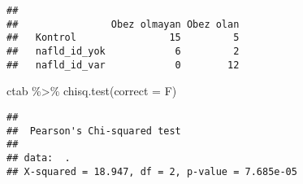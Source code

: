 \documentclass[
]{article}
\newenvironment{Shaded}{\begin{snugshade}}{\end{snugshade}}
\newcommand{\AttributeTok}[1]{\textcolor[rgb]{0.77,0.63,0.00}{#1}}
\newcommand{\FunctionTok}[1]{\textcolor[rgb]{0.00,0.00,0.00}{#1}}
\newcommand{\NormalTok}[1]{#1}
\newcommand{\SpecialCharTok}[1]{\textcolor[rgb]{0.00,0.00,0.00}{#1}}
\begin{document}
\begin{verbatim}
##               
##                Obez olmayan Obez olan
##   Kontrol                15         5
##   nafld_id_yok            6         2
##   nafld_id_var            0        12
\end{verbatim}

\begin{Shaded}
\begin{Highlighting}[]
\NormalTok{ctab }\SpecialCharTok{\%\textgreater{}\%}
  \FunctionTok{chisq.test}\NormalTok{(}\AttributeTok{correct =}\NormalTok{ F)}
\end{Highlighting}
\end{Shaded}

\begin{verbatim}
## 
##  Pearson's Chi-squared test
## 
## data:  .
## X-squared = 18.947, df = 2, p-value = 7.685e-05
\end{verbatim}
\end{document}
